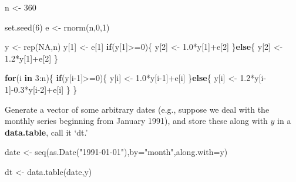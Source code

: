\documentclass[
  oneside]{book}
\newenvironment{Shaded}{\begin{snugshade}}{\end{snugshade}}
\newcommand{\AttributeTok}[1]{\textcolor[rgb]{0.77,0.63,0.00}{#1}}
\newcommand{\ConstantTok}[1]{\textcolor[rgb]{0.00,0.00,0.00}{#1}}
\newcommand{\ControlFlowTok}[1]{\textcolor[rgb]{0.13,0.29,0.53}{\textbf{#1}}}
\newcommand{\DecValTok}[1]{\textcolor[rgb]{0.00,0.00,0.81}{#1}}
\newcommand{\FloatTok}[1]{\textcolor[rgb]{0.00,0.00,0.81}{#1}}
\newcommand{\FunctionTok}[1]{\textcolor[rgb]{0.00,0.00,0.00}{#1}}
\newcommand{\NormalTok}[1]{#1}
\newcommand{\OtherTok}[1]{\textcolor[rgb]{0.56,0.35,0.01}{#1}}
\newcommand{\SpecialCharTok}[1]{\textcolor[rgb]{0.00,0.00,0.00}{#1}}
\newcommand{\StringTok}[1]{\textcolor[rgb]{0.31,0.60,0.02}{#1}}
\begin{document}
\begin{Shaded}
\begin{Highlighting}[]
\NormalTok{n }\OtherTok{\textless{}{-}} \DecValTok{360}

\FunctionTok{set.seed}\NormalTok{(}\DecValTok{6}\NormalTok{)}
\NormalTok{e }\OtherTok{\textless{}{-}} \FunctionTok{rnorm}\NormalTok{(n,}\DecValTok{0}\NormalTok{,}\DecValTok{1}\NormalTok{)}

\NormalTok{y }\OtherTok{\textless{}{-}} \FunctionTok{rep}\NormalTok{(}\ConstantTok{NA}\NormalTok{,n)}
\NormalTok{y[}\DecValTok{1}\NormalTok{] }\OtherTok{\textless{}{-}}\NormalTok{ e[}\DecValTok{1}\NormalTok{]}
\ControlFlowTok{if}\NormalTok{(y[}\DecValTok{1}\NormalTok{]}\SpecialCharTok{\textgreater{}=}\DecValTok{0}\NormalTok{)\{}
\NormalTok{  y[}\DecValTok{2}\NormalTok{] }\OtherTok{\textless{}{-}}  \FloatTok{1.0}\SpecialCharTok{*}\NormalTok{y[}\DecValTok{1}\NormalTok{]}\SpecialCharTok{+}\NormalTok{e[}\DecValTok{2}\NormalTok{]}
\NormalTok{\}}\ControlFlowTok{else}\NormalTok{\{}
\NormalTok{  y[}\DecValTok{2}\NormalTok{] }\OtherTok{\textless{}{-}} \FloatTok{1.2}\SpecialCharTok{*}\NormalTok{y[}\DecValTok{1}\NormalTok{]}\SpecialCharTok{+}\NormalTok{e[}\DecValTok{2}\NormalTok{]}
\NormalTok{\}}

\ControlFlowTok{for}\NormalTok{(i }\ControlFlowTok{in} \DecValTok{3}\SpecialCharTok{:}\NormalTok{n)\{}
  \ControlFlowTok{if}\NormalTok{(y[i}\DecValTok{{-}1}\NormalTok{]}\SpecialCharTok{\textgreater{}=}\DecValTok{0}\NormalTok{)\{}
\NormalTok{    y[i] }\OtherTok{\textless{}{-}}  \FloatTok{1.0}\SpecialCharTok{*}\NormalTok{y[i}\DecValTok{{-}1}\NormalTok{]}\SpecialCharTok{+}\NormalTok{e[i]}
\NormalTok{  \}}\ControlFlowTok{else}\NormalTok{\{}
\NormalTok{    y[i] }\OtherTok{\textless{}{-}} \FloatTok{1.2}\SpecialCharTok{*}\NormalTok{y[i}\DecValTok{{-}1}\NormalTok{]}\SpecialCharTok{{-}}\FloatTok{0.3}\SpecialCharTok{*}\NormalTok{y[i}\DecValTok{{-}2}\NormalTok{]}\SpecialCharTok{+}\NormalTok{e[i]}
\NormalTok{  \}}
\NormalTok{\}}
\end{Highlighting}
\end{Shaded}

Generate a vector of some arbitrary dates (e.g., suppose we deal with the monthly series beginning from January 1991), and store these along with \(y\) in a \textbf{data.table}, call it `dt.'

\begin{Shaded}
\begin{Highlighting}[]
\NormalTok{date }\OtherTok{\textless{}{-}} \FunctionTok{seq}\NormalTok{(}\FunctionTok{as.Date}\NormalTok{(}\StringTok{"1991{-}01{-}01"}\NormalTok{),}\AttributeTok{by=}\StringTok{"month"}\NormalTok{,}\AttributeTok{along.with=}\NormalTok{y)}

\NormalTok{dt }\OtherTok{\textless{}{-}} \FunctionTok{data.table}\NormalTok{(date,y)}
\end{Highlighting}
\end{Shaded}
\end{document}

